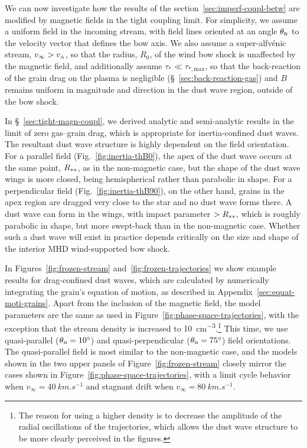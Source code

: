 We can now investigate how the results of the
section~\ref{sec:imperf-coupl-betw} are modified by magnetic fields in
the tight coupling limit.  For simplicity, we assume a uniform field
in the incoming stream, with field lines oriented at an angle
\(\theta_{\scriptscriptstyle\text{B}}\) to the velocity vector that defines the bow axis.  We also
assume a super-alfvénic stream, \(v_\infty > v_{\scriptscriptstyle\text{A}}\), so that the
radius, \(R_0\), of the wind bow shock is unaffected by the magnetic
field, and additionally assume \(\tau_* \ll \tau_{*, \text{max}}\), so that
the back-reaction of the grain drag on the plasma is negligible
(\S~\ref{sec:back-reaction-gas}) and \(B\) remains uniform in
magnitude and direction in the dust wave region, outside of the bow
shock.

In \S~\ref{sec:tight-magn-coupl}, we derived analytic and
semi-analytic results in the limit of zero gas--grain drag, which is
appropriate for inertia-confined dust waves.  The resultant dust wave
structure is highly dependent on the field orientation.  For a
parallel field (Fig.~\ref{fig:inertia-thB0}), the apex of the dust
wave occurs at the same point, \(R_{**}\), as in the non-magnetic
case, but the shape of the dust wave wings is more closed, being
hemispherical rather than parabolic in shape.  For a perpendicular
field (Fig.~\ref{fig:inertia-thB90}), on the other hand, grains in the
apex region are dragged very close to the star and no dust wave forms
there.  A dust wave can form in the wings, with impact parameter
\(> R_{**}\), which is roughly parabolic in shape, but more
swept-back than in the non-magnetic case.  Whether such a dust wave
will exist in practice depends critically on the size and shape of the
interior MHD wind-supported bow shock.

In Figures~\ref{fig:frozen-stream} and~\ref{fig:frozen-trajectories}
we show example results for drag-confined dust waves, which are
calculated by numerically integrating the grain's equation of motion,
as described in Appendix~\ref{sec:equat-moti-grains}. Apart from the
inclusion of the magnetic field, the model parameters are the same as
used in Figure~\ref{fig:phase-space-trajectories}, with the exception
that the stream density is increased to \SI{10}{cm^{-3}}.\footnote{The
  reason for using a higher density is to decrease the amplitude of
  the radial oscillations of the trajectories, which allows the dust
  wave structure to be more clearly perceived in the figures. } This
time, we use quasi-parallel (\(\theta_{\scriptscriptstyle\text{B}} = \ang{10}\)) and
quasi-perpendicular (\(\theta_{\scriptscriptstyle\text{B}} = \ang{75}\)) field orientations.  The
quasi-parallel field is most similar to the non-magnetic case, and the
models shown in the two upper panels of Figure~\ref{fig:frozen-stream}
closely mirror the cases shown in
Figure~\ref{fig:phase-space-trajectories}, with a limit cycle behavior
when \(v_\infty = \SI{40}{km.s^{-1}}\) and stagnant drift when
\(v_\infty = \SI{80}{km.s^{-1}}\).

